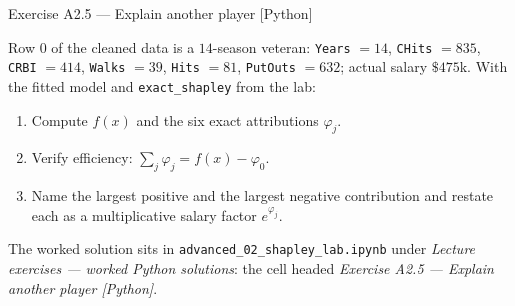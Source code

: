 \documentclass[aspectratio=169,11pt]{beamer}
\begin{document}
\begin{frame}{Exercise A2.5 --- Explain another player [Python]}
\begin{exercise}
  Row $0$ of the cleaned data is a $14$-season veteran: \texttt{Years} $=14$,
  \texttt{CHits} $=835$, \texttt{CRBI} $=414$, \texttt{Walks} $=39$,
  \texttt{Hits} $=81$, \texttt{PutOuts} $=632$; actual salary $\$475$k.
  With the fitted model and \texttt{exact\_shapley} from the lab:
  \begin{enumerate}
    \item Compute $f(x)$ and the six exact attributions $\varphi_j$.
    \item Verify efficiency: $\sum_j\varphi_j = f(x)-\varphi_0$.
    \item Name the largest positive and the largest negative contribution and
          restate each as a multiplicative salary factor $e^{\varphi_j}$.
  \end{enumerate}
\end{exercise}
\begin{labnote}
  The worked solution sits in \texttt{advanced\_02\_shapley\_lab.ipynb} under
  \emph{Lecture exercises --- worked Python solutions}: the cell headed
  \emph{Exercise A2.5 --- Explain another player [Python]}.
\end{labnote}
\end{frame}
\end{document}
